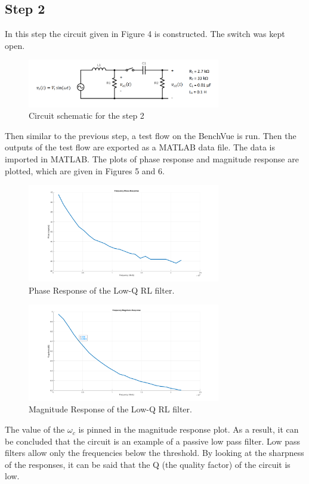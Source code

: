 \documentclass[letterpaper,12pt]{article}
\begin{document}
\subsection{Step 2}
In this step the circuit given in Figure 4 is constructed. The switch was kept open. 
\begin{figure}[H]
    \centering
    \includegraphics[width = 0.75\textwidth]{lowqlowpass.png}
    \caption{Circuit schematic for the step 2}
\end{figure} 
Then similar to the previous step, a test flow on the BenchVue is run. Then the outputs of the test flow are exported as a MATLAB data file. The data is imported in MATLAB. The plots of phase response and magnitude response are plotted, which are given in Figures 5 and 6.
\begin{figure}[H]
    \centering
    \includegraphics[width = 0.75\textwidth]{2_1_2.png}
    \caption{Phase Response of the Low-Q RL filter.}
\end{figure} 

\begin{figure}[H]
    \centering
    \includegraphics[width = 0.75\textwidth]{2_1_1.png}
    \caption{Magnitude Response of the Low-Q RL filter.}
\end{figure} 
The value of the \(\omega_c\) is pinned in the magnitude response plot. As a result, it can be concluded that the circuit is an example of a passive low pass filter. Low pass filters allow only the frequencies below the threshold. By looking at the sharpness of the responses, it can be said that the Q (the quality factor) of the circuit is low. 
    
\end{document}
